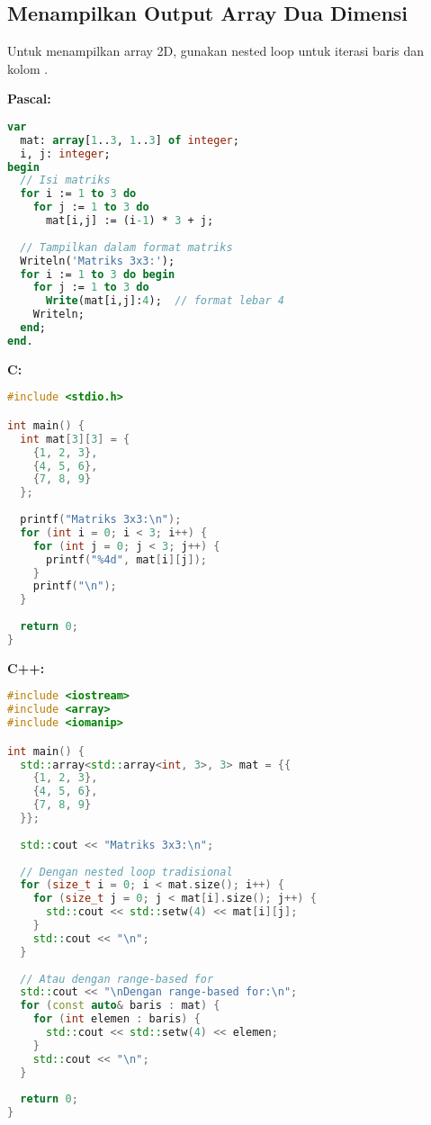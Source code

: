 \documentclass[../main.tex]{subfiles}
\begin{document}
\subsection{Menampilkan Output Array Dua Dimensi}

Untuk menampilkan array 2D, gunakan nested loop untuk iterasi baris dan kolom \parencite{cplusplus-multidimensional,tutorialspoint-2d-arrays}.

\textbf{Pascal:}
\begin{lstlisting}[language=Pascal, caption={Menampilkan array 2D di Pascal}]
var
  mat: array[1..3, 1..3] of integer;
  i, j: integer;
begin
  // Isi matriks
  for i := 1 to 3 do
    for j := 1 to 3 do
      mat[i,j] := (i-1) * 3 + j;
  
  // Tampilkan dalam format matriks
  Writeln('Matriks 3x3:');
  for i := 1 to 3 do begin
    for j := 1 to 3 do
      Write(mat[i,j]:4);  // format lebar 4
    Writeln;
  end;
end.
\end{lstlisting}

\textbf{C:}
\begin{lstlisting}[language=C, caption={Menampilkan array 2D di C}]
#include <stdio.h>

int main() {
  int mat[3][3] = {
    {1, 2, 3},
    {4, 5, 6},
    {7, 8, 9}
  };
  
  printf("Matriks 3x3:\n");
  for (int i = 0; i < 3; i++) {
    for (int j = 0; j < 3; j++) {
      printf("%4d", mat[i][j]);
    }
    printf("\n");
  }
  
  return 0;
}
\end{lstlisting}

\textbf{C++:}
\begin{lstlisting}[language=C++, caption={Menampilkan array 2D di C++}]
#include <iostream>
#include <array>
#include <iomanip>

int main() {
  std::array<std::array<int, 3>, 3> mat = {{
    {1, 2, 3},
    {4, 5, 6},
    {7, 8, 9}
  }};
  
  std::cout << "Matriks 3x3:\n";
  
  // Dengan nested loop tradisional
  for (size_t i = 0; i < mat.size(); i++) {
    for (size_t j = 0; j < mat[i].size(); j++) {
      std::cout << std::setw(4) << mat[i][j];
    }
    std::cout << "\n";
  }
  
  // Atau dengan range-based for
  std::cout << "\nDengan range-based for:\n";
  for (const auto& baris : mat) {
    for (int elemen : baris) {
      std::cout << std::setw(4) << elemen;
    }
    std::cout << "\n";
  }
  
  return 0;
}
\end{lstlisting}
\end{document}

